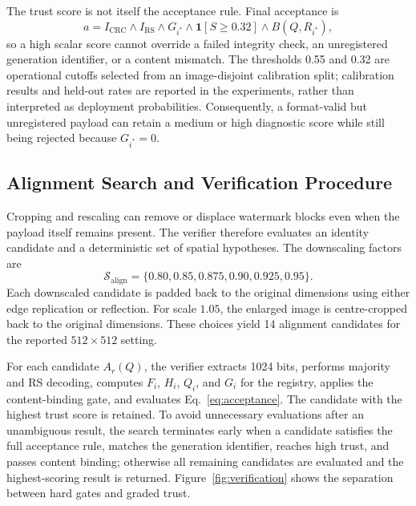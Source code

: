 \documentclass[a4paper,fleqn]{cas-sc}
\begin{document}
The trust score is not itself the acceptance rule. Final acceptance is
\begin{equation}
  a=
  I_{\mathrm{CRC}}
  \wedge I_{\mathrm{RS}}
  \wedge G_{i^*}
  \wedge \mathbf{1}[S\ge0.32]
  \wedge B(Q,R_{i^*}),
  \label{eq:acceptance}
\end{equation}
so a high scalar score cannot override a failed integrity check, an
unregistered generation identifier, or a content mismatch. The thresholds
0.55 and 0.32 are operational cutoffs selected from an image-disjoint
calibration split; calibration results and held-out rates are reported in the
experiments, rather than interpreted as deployment probabilities. Consequently,
a format-valid but unregistered payload can retain a medium or high diagnostic
score while still being rejected because $G_{i^*}=0$.

\subsection{Alignment Search and Verification Procedure}
Cropping and rescaling can remove or displace watermark blocks even when the
payload itself remains present. The verifier therefore evaluates an identity
candidate and a deterministic set of spatial hypotheses. The downscaling
factors are
\begin{equation}
  \mathcal{S}_{\mathrm{align}}
  =\{0.80,0.85,0.875,0.90,0.925,0.95\}.
  \label{eq:alignment-scales}
\end{equation}
Each downscaled candidate is padded back to the original dimensions using
either edge replication or reflection. For scale $1.05$, the enlarged image is
centre-cropped back to the original dimensions. These choices yield 14
alignment candidates for the reported $512\times512$ setting.

For each candidate $A_r(Q)$, the verifier extracts 1024 bits, performs
majority and RS decoding, computes $F_i$, $H_i$, $Q_i$, and $G_i$ for the
registry, applies the content-binding gate, and evaluates
Eq.~\eqref{eq:acceptance}. The candidate with the highest trust score is
retained. To avoid unnecessary evaluations after an unambiguous result, the
search terminates early when a candidate satisfies the full acceptance rule,
matches the generation identifier, reaches high trust, and passes content
binding; otherwise all remaining candidates are evaluated and the
highest-scoring result is returned. Figure~\ref{fig:verification} shows the
separation between hard gates and graded trust.
\end{document}
